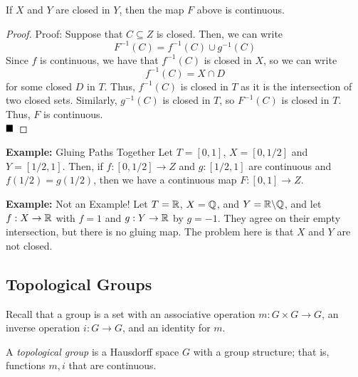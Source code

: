 \begin{theorem}
    If $X$ and $Y$ are closed in $Y$, then the map $F$ above is continuous.
\end{theorem}
\begin{proof}{Proof:}
    Suppose that $C \subseteq Z$ is closed. Then, we can write
    \[ F^{-1}(C) = f^{-1}(C) \cup g^{-1}(C) \]
    Since $f$ is continuous, we have that $f^{-1}(C)$ is closed in $X$, so we can write
    \[ f^{-1}(C) = X \cap D \]
    for some closed $D$ in $T$. Thus, $f^{-1}(C)$ is closed in $T$ as it is the intersection of two closed sets. Similarly, $g^{-1}(C)$ is closed in $T$, so $F^{-1}(C)$ is closed in $T$. Thus, $F$ is continuous.\\
    
    $\qed$
\end{proof}

\begin{example}{\textbf{Example:} Gluing Paths Together}
    Let $T = [0, 1]$, $X = [0, 1/2]$ and $Y = [1/2, 1]$. Then, if $f : [0, 1/2] \to Z$ and $g : [1/2, 1]$ are continuous and $f(1/2) = g(1/2)$, then we have a continuous map $F : [0, 1] \to Z$. 
\end{example}

\begin{example}{\textbf{Example:} Not an Example!}
    Let $T = \mathbb{R}$, $X = \mathbb{Q}$, and $Y = \mathbb{R} \backslash \mathbb{Q}$, and let $f : X \to \mathbb{R}$ with $f = 1$ and $g : Y \to \mathbb{R}$ by $g = -1$. They agree on their empty intersection, but there is no gluing map. The problem here is that $X$ and $Y$ are not closed. 
\end{example}

\subsection*{Topological Groups}
\sectionspace

Recall that a group is a set with an associative operation $m : G \times G \to G$, an inverse operation $i : G \to G$, and an identity for $m$. 

\begin{definition}
    A \emph{topological group} is a Hausdorff space $G$ with a group structure; that is, functions $m, i$ that are continuous. 
\end{definition}

